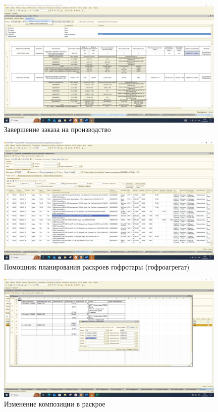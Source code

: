 \begin{figure}
\begin{center}
 \includegraphics[height=0.35\textheight, keepaspectratio]{Pics/ПЛ6.jpg}
\end{center}
 \caption{Завершение заказа на производство}
 \label{pic:ПЛ6}
\end{figure}


\begin{figure}
\begin{center}
 \includegraphics[height=0.45\textheight, angle=90, keepaspectratio]{Pics/ПЛ7.jpg}
\end{center}
 \caption{Помощник планирования раскроев гофротары (гофроагрегат)}
 \label{pic:ПЛ7}
\end{figure}


\begin{figure}
\begin{center}
 \includegraphics[height=0.35\textheight, keepaspectratio]{Pics/ПЛ8.jpg}
\end{center}
 \caption{Изменение композиции в раскрое}
 \label{pic:ПЛ8}
\end{figure}

